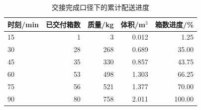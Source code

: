 \begin{table}[htbp]\centering\small
\caption{交接完成口径下的累计配送进度}\label{tab:rev_q2_milestones}
\begin{tabular}{lrrrr}\toprule
时刻/min & 已交付箱数 & 质量/kg & 体积/m$^3$ & 箱数进度/\%\\\midrule
15 & 1 & 3 & 0.012 & 1.25\\
30 & 28 & 268 & 0.689 & 35.00\\
45 & 35 & 330 & 0.857 & 43.75\\
60 & 53 & 498 & 1.303 & 66.25\\
75 & 56 & 521 & 1.377 & 70.00\\
90 & 80 & 758 & 2.011 & 100.00\\
\bottomrule\end{tabular}
\end{table}
